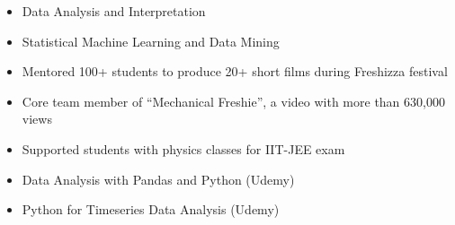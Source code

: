 \documentclass[10pt,a4paper,ragged2e,withhyper]{altacv}
\begin{document}
\begin{paracol}{2}
\begin{itemize}
\item Data Analysis and Interpretation
\item Statistical Machine Learning and Data Mining
\end{itemize}



\label{sec:org4a65c41}

\begin{itemize}
\item Mentored 100+ students to produce 20+ short films during Freshizza festival
\item Core team member of ``Mechanical Freshie'', a video with more than 630,000 views
\item Supported students with physics classes for IIT-JEE exam
\end{itemize}

\label{sec:org06b6975}

\begin{itemize}
\item Data Analysis with Pandas and Python (Udemy)
\item Python for Timeseries Data Analysis (Udemy)
\end{itemize}

\end{paracol}
\end{document}
